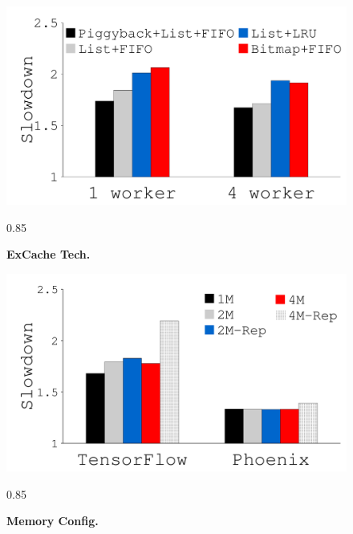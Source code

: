 \documentclass[10pt,times,twocolumn]{z2-article}
\renewcommand{\em}{\it}
\newcommand{\beforecaption}{\vspace{-.15cm}\begin{spacing}{0.85}}
\newcommand{\aftercaption}{\vspace{-.45cm}\end{spacing}}
\newcommand{\mycaption}[3]{\beforecaption\caption{\label{#1}{\bf\footnotesize #2} \em\scriptsize #3}\aftercaption}
\begin{document}
{{{{{{{{\begin{figure}[th]
\begin{minipage}{0.50\columnwidth}
\begin{center}
{}
\end{center}
\end{minipage}
\begin{minipage}{0.50\columnwidth}
\begin{center}
\centerline{\includegraphics[width=1.0\columnwidth]{Figures/g_plot_LEGO_excache_tech.pdf}}
\vspace{-0.06in}
\mycaption{fig-excache-opt}{ExCache Tech.}
{
}
\end{center}
\end{minipage}
\begin{minipage}{0.50\columnwidth}
\begin{center}
\centerline{\includegraphics[width=1.0\columnwidth]{Figures/g_plot_LEGO_number_memory_rep.pdf}}
\vspace{-0.06in}
\mycaption{fig-mem-rep}{Memory Config.}
{
}
\end{center}
\end{minipage}
\vspace{-0.1in}
\end{figure}
}

}}}}}}}
\end{document}
